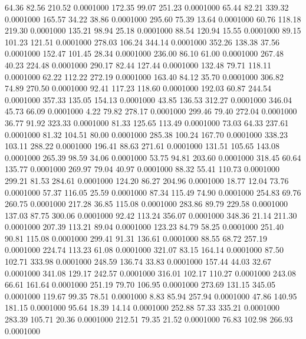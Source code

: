   64.36   82.56  210.52   0.0001000
 172.35   99.07  251.23   0.0001000
  65.44   82.21  339.32   0.0001000
 165.57   34.22   38.86   0.0001000
 295.60   75.39   13.64   0.0001000
  60.76  118.18  219.30   0.0001000
 135.21   98.94   25.18   0.0001000
  88.54  120.94   15.55   0.0001000
  89.15  101.23  121.51   0.0001000
 278.03  106.24  344.14   0.0001000
 352.26  138.38   37.56   0.0001000
 152.47  101.45   28.34   0.0001000
 236.00   86.10   61.00   0.0001000
 267.48   40.23  224.48   0.0001000
 290.17   82.44  127.44   0.0001000
 132.48   79.71  118.11   0.0001000
  62.22  112.22  272.19   0.0001000
 163.40   84.12   35.70   0.0001000
 306.82   74.89  270.50   0.0001000
  92.41  117.23  118.60   0.0001000
 192.03   60.87  244.54   0.0001000
 357.33  135.05  154.13   0.0001000
  43.85  136.53  312.27   0.0001000
 346.04   45.73   66.09   0.0001000
   4.22   79.82  278.17   0.0001000
 299.46   79.40  272.04   0.0001000
  36.77   91.92  323.33   0.0001000
  81.33  125.65  113.49   0.0001000
  73.03   64.33  237.61   0.0001000
  81.32  104.51   80.00   0.0001000
 285.38  100.24  167.70   0.0001000
 338.23  103.11  288.22   0.0001000
 196.41   88.63  271.61   0.0001000
 131.51  105.65  143.08   0.0001000
 265.39   98.59   34.06   0.0001000
  53.75   94.81  203.60   0.0001000
 318.45   60.64  135.77   0.0001000
 269.97   79.04   40.97   0.0001000
  88.32   55.41  110.73   0.0001000
 299.21   81.53  284.61   0.0001000
 124.20   86.27  204.96   0.0001000
  18.77   12.04   73.76   0.0001000
  57.37  116.05   25.59   0.0001000
  87.34  115.49   74.90   0.0001000
 254.83   69.76  260.75   0.0001000
 217.28   36.85  115.08   0.0001000
 283.86   89.79  229.58   0.0001000
 137.03   87.75  300.06   0.0001000
  92.42  113.24  356.07   0.0001000
 348.36   21.14  211.30   0.0001000
 207.39  113.21   89.04   0.0001000
 123.23   84.79   58.25   0.0001000
 251.40   90.81  115.08   0.0001000
 299.41   91.31  136.61   0.0001000
  88.55   68.72  257.19   0.0001000
 224.74  113.23   61.08   0.0001000
 321.07   83.15  164.14   0.0001000
  87.50  102.71  333.98   0.0001000
 248.59  136.74   33.83   0.0001000
 157.44   44.03   32.67   0.0001000
 341.08  129.17  242.57   0.0001000
 316.01  102.17  110.27   0.0001000
 243.08   66.61  161.64   0.0001000
 251.19   79.70  106.95   0.0001000
 273.69  131.15  345.05   0.0001000
 119.67   99.35   78.51   0.0001000
   8.83   85.94  257.94   0.0001000
  47.86  140.95  181.15   0.0001000
  95.64   18.39   14.14   0.0001000
 252.88   57.33  335.21   0.0001000
 283.39  105.71   20.36   0.0001000
 212.51   79.35   21.52   0.0001000
  76.83  102.98  266.93   0.0001000
